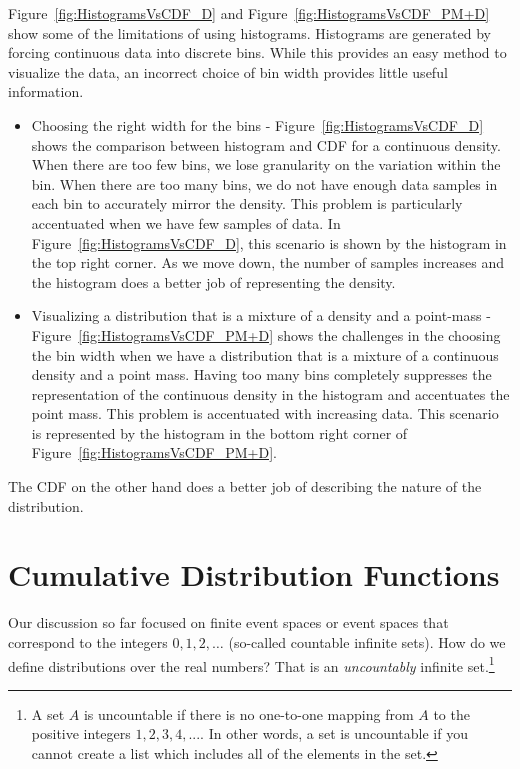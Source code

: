Figure~\ref{fig:HistogramsVsCDF_D}  and Figure~\ref{fig:HistogramsVsCDF_PM+D} show some of the limitations of using histograms.
Histograms are generated by forcing continuous data into discrete bins. While this provides an easy method to visualize the data, an incorrect choice of bin width provides little useful information.
\begin{itemize}
\item Choosing the right width for the bins - Figure~\ref{fig:HistogramsVsCDF_D} shows the comparison between histogram and CDF for a continuous density. When there are too few bins, we lose granularity on the variation within the bin. When there are too many bins, we do not have enough data samples in each bin to accurately mirror the density. This problem is particularly accentuated when we have few samples of data. In Figure~\ref{fig:HistogramsVsCDF_D}, this scenario is shown by the histogram in the top right corner. As we move down, the number of samples increases and the histogram does a better job of representing the density. 
\item Visualizing a distribution that is a mixture of a density and a point-mass - Figure~\ref{fig:HistogramsVsCDF_PM+D} shows the challenges in the choosing the bin width when we have a distribution that is a mixture of a continuous density and a point mass. Having too many bins completely suppresses the representation of the continuous density in the histogram and accentuates the point mass. This problem is accentuated with increasing data. This scenario is represented by the histogram in the bottom right corner of Figure~\ref{fig:HistogramsVsCDF_PM+D}.
\end{itemize}
The CDF on the other hand does a better job of describing the nature of the distribution.\section{Cumulative Distribution Functions}

Our discussion so far focused on finite event spaces or event spaces
that correspond to the integers $0,1,2,\ldots$ (so-called countable
infinite sets). How do we define distributions over the real numbers?
That is an {\em uncountably} infinite set.\footnote{A set $A$ is
  uncountable if there is no one-to-one mapping from $A$ to the
  positive integers $1,2,3,4,...$. In other words, a set is
  uncountable if you cannot create a list which includes all of the
  elements in the set.}

